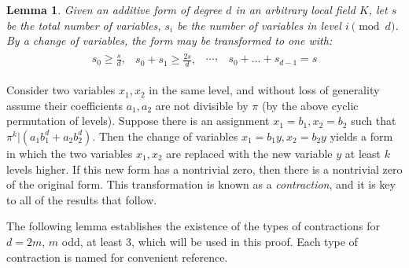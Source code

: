 \documentclass[12pt]{amsart}
\newtheorem{lemma}{Lemma}
\begin{document}
\begin{lemma}
Given an additive form of degree $d$ in an arbitrary local field $K$, let $s$ be the total number of variables, $s_i$ be the number of variables in level $i \pmod{d}$. By a change of variables, the form may be transformed to one with:
\begin{align}
\begin{split}
s_0 \ge \frac{s}{d},  
\end{split}
\begin{split}
s_0 + s_1 \ge \frac{2s}{d},
\end{split}
\begin{split}
\ldots,
\end{split}
\begin{split}
s_0 + \ldots + s_{d-1} = s
\end{split}
\end{align}
\end{lemma}

Consider two variables $x_1,x_2$ in the same level, and without loss of generality assume their coefficients $a_1,a_2$ are not divisible by $\pi$ (by the above cyclic permutation of levels).  Suppose there is an assignment $x_1 = b_1, x_2 = b_2$ such that $\pi^k | (a_1 b_1^d + a_2 b_2^d)$.  Then the change of variables $x_1=b_1 y, x_2 = b_2 y$ yields a form in which the two variables $x_1, x_2$ are replaced with the new variable $y$ at least $k$ levels higher.  If this new form has a nontrivial zero, then there is a nontrivial zero of the original form.  This transformation is known as a \textit{contraction}, and it is key to all of the results that follow.

The following lemma establishes the existence of the types of contractions for $d=2m$, $m$ odd, at least 3, which will be used in this proof.  Each type of contraction is named for convenient reference.
\end{document}
